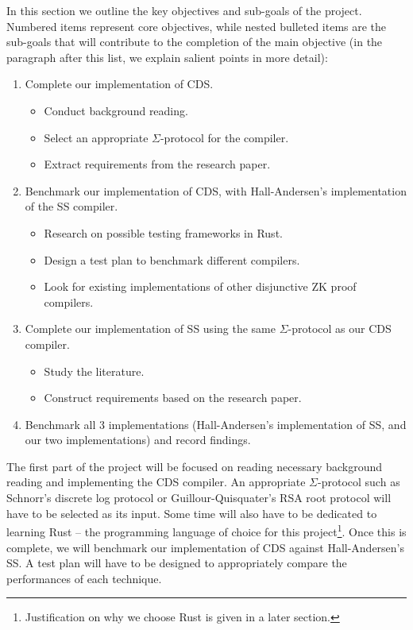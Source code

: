 In this section we outline the key objectives and sub-goals of the project. Numbered items represent core objectives, while nested bulleted items are the sub-goals that will contribute to the completion of the main objective (in the paragraph after this list, we explain salient points in more detail):
\begin{enumerate}
    \item Complete our implementation of CDS.
    \begin{itemize}
        \item Conduct background reading.
        \item Select an appropriate $\Sigma$-protocol for the compiler.
        \item Extract requirements from the research paper. 
    \end{itemize}
    \item Benchmark our implementation of CDS, with Hall-Andersen's implementation \cite{MHAStackSig} of the SS compiler.
    \begin{itemize}
        \item Research on possible testing frameworks in Rust. 
        \item Design a test plan to benchmark different compilers. 
        \item Look for existing implementations of other disjunctive ZK proof compilers.
    \end{itemize}
    \item Complete our implementation of SS using the same $\Sigma$-protocol as our CDS compiler.
    \begin{itemize}
        \item Study the literature.
        \item Construct requirements based on the research paper.
    \end{itemize}
    \item Benchmark all 3 implementations (Hall-Andersen's implementation of SS, and our two implementations) and record findings.
\end{enumerate}
The first part of the project will be focused on reading necessary background reading and implementing the CDS compiler. An appropriate $\Sigma$-protocol such as Schnorr's discrete log protocol \cite{Schnorr} or Guillour-Quisquater's RSA root protocol \cite{Guillou1988APZ} will have to be selected as its input. Some time will also have to be dedicated to learning Rust \cite{Rust} -- the programming language of choice for this project\footnote{Justification on why we choose Rust is given in a later section.}. Once this is complete, we will benchmark our implementation of CDS against Hall-Andersen's SS. A test plan will have to be designed to appropriately compare the performances of each technique.

